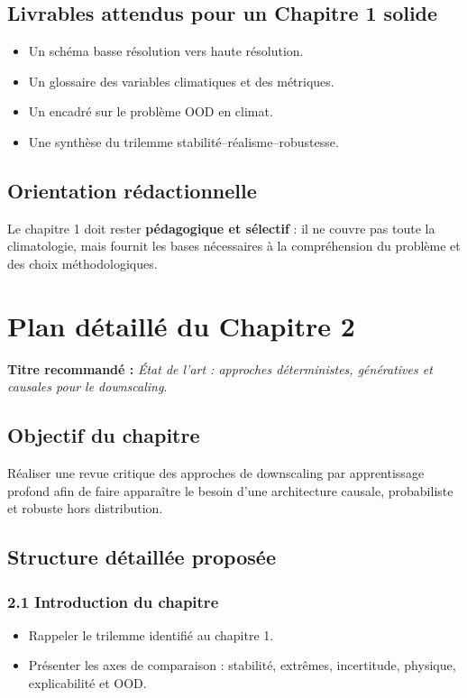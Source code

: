 \documentclass[12pt,a4paper]{article}
\begin{document}
\subsection*{Livrables attendus pour un Chapitre 1 solide}
\begin{itemize}
    \item Un sch\'ema basse r\'esolution vers haute r\'esolution.
    \item Un glossaire des variables climatiques et des m\'etriques.
    \item Un encadr\'e sur le probl\`eme OOD en climat.
    \item Une synth\`ese du trilemme stabilit\'e--r\'ealisme--robustesse.
\end{itemize}

\subsection*{Orientation r\'edactionnelle}
Le chapitre 1 doit rester \textbf{p\'edagogique et s\'electif} : il ne couvre pas toute la climatologie, mais fournit les bases n\'ecessaires \`a la compr\'ehension du probl\`eme et des choix m\'ethodologiques.

\section{Plan d\'etaill\'e du Chapitre 2}
\textbf{Titre recommand\'e :} \emph{\'Etat de l'art : approches d\'eterministes, g\'en\'eratives et causales pour le downscaling}.

\subsection*{Objectif du chapitre}
R\'ealiser une revue critique des approches de downscaling par apprentissage profond afin de faire appara\^itre le besoin d'une architecture causale, probabiliste et robuste hors distribution.

\subsection*{Structure d\'etaill\'ee propos\'ee}

\subsubsection*{2.1 Introduction du chapitre}
\begin{itemize}
    \item Rappeler le trilemme identifi\'e au chapitre 1.
    \item Pr\'esenter les axes de comparaison : stabilit\'e, extr\^emes, incertitude, physique, explicabilit\'e et OOD.
\end{itemize}
\end{document}
